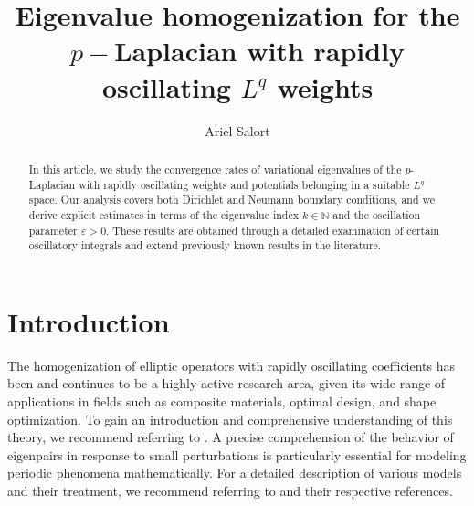 \documentclass[12pt]{amsart}
\title[Eigenvalue homogenization for the $p-$Laplacian with $L^q$ weights]{Eigenvalue homogenization for the $p-$Laplacian with rapidly oscillating $L^q$ weights}
\author{Ariel Salort}
\theoremstyle{definition}
\theoremstyle{remark}
\numberwithin{equation}{section}
\begin{document}


\begin{abstract}
In this article, we study the convergence rates of variational eigenvalues of the $p$-Laplacian with rapidly oscillating weights and potentials belonging in a suitable $L^q$ space. Our analysis covers both Dirichlet and Neumann boundary conditions, and we derive explicit estimates in terms of the eigenvalue index $k \in \mathbb{N}$ and the oscillation parameter $\varepsilon > 0$. These results are obtained through a detailed examination of certain oscillatory integrals and extend previously known results in the literature.
\end{abstract}




 
\maketitle
 
 
\section{Introduction}
The homogenization of elliptic operators with rapidly oscillating coefficients has been and continues to be a highly active research area, given its wide range of applications in fields such as composite materials, optimal design, and shape optimization. To gain an introduction and comprehensive understanding of this theory, we recommend referring to \cite{A,CZ,JKO,k1,MV,OSY,SV}. A precise comprehension of the behavior of eigenpairs in response to small perturbations is particularly essential for modeling periodic phenomena mathematically. For a detailed description of various models and their treatment, we recommend referring to \cite{A,OSY} and their respective references.
\end{document}
